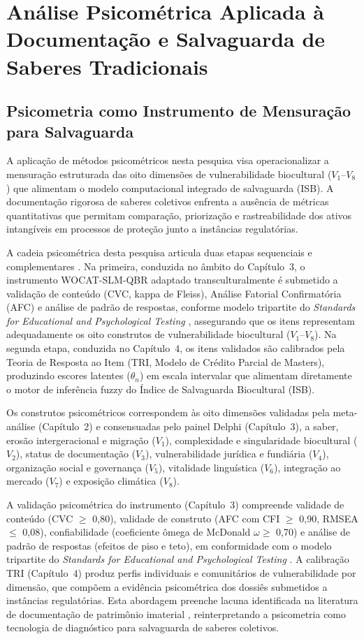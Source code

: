 \section{Análise Psicométrica Aplicada à Documentação e Salvaguarda de Saberes Tradicionais}

\subsection{Psicometria como Instrumento de Mensuração para Salvaguarda}

A aplicação de métodos psicométricos nesta pesquisa visa operacionalizar a mensuração estruturada das oito dimensões de vulnerabilidade biocultural ($V_1$--$V_8$) que alimentam o modelo computacional integrado de salvaguarda (ISB). A documentação rigorosa de saberes coletivos enfrenta a ausência de métricas quantitativas que permitam comparação, priorização e rastreabilidade dos ativos intangíveis em processos de proteção junto a instâncias regulatórias.

A cadeia psicométrica desta pesquisa articula duas etapas sequenciais e complementares \cite{SmithParr2000,ZhouWang2022}. Na primeira, conduzida no âmbito do Capítulo~3, o instrumento WOCAT-SLM-QBR adaptado transculturalmente é submetido a validação de conteúdo (CVC, kappa de Fleiss), Análise Fatorial Confirmatória (AFC) e análise de padrão de respostas, conforme modelo tripartite do \textit{Standards for Educational and Psychological Testing} \cite{Association2018}, assegurando que os itens representam adequadamente os oito construtos de vulnerabilidade biocultural ($V_1$--$V_8$). Na segunda etapa, conduzida no Capítulo~4, os itens validados são calibrados pela Teoria de Resposta ao Item (TRI, Modelo de Crédito Parcial de Masters), produzindo escores latentes ($\theta_n$) em escala intervalar que alimentam diretamente o motor de inferência fuzzy do Índice de Salvaguarda Biocultural (ISB).

Os construtos psicométricos correspondem às oito dimensões validadas pela meta-análise (Capítulo~2) e consensuadas pelo painel Delphi (Capítulo~3), a saber, erosão intergeracional e migração ($V_1$), complexidade e singularidade biocultural ($V_2$), status de documentação ($V_3$), vulnerabilidade jurídica e fundiária ($V_4$), organização social e governança ($V_5$), vitalidade linguística ($V_6$), integração ao mercado ($V_7$) e exposição climática ($V_8$).

A validação psicométrica do instrumento (Capítulo~3) compreende validade de conteúdo (CVC $\geq$ 0,80), validade de construto (AFC com CFI $\geq$ 0,90, RMSEA $\leq$ 0,08), confiabilidade (coeficiente ômega de McDonald $\omega \geq$ 0,70) e análise de padrão de respostas (efeitos de piso e teto), em conformidade com o modelo tripartite do \textit{Standards for Educational and Psychological Testing} \cite{Association2018}. A calibração TRI (Capítulo~4) produz perfis individuais e comunitários de vulnerabilidade por dimensão, que compõem a evidência psicométrica dos dossiês submetidos a instâncias regulatórias. Esta abordagem preenche lacuna identificada na literatura de documentação de patrimônio imaterial \cite{Lev2001,WuLi2022}, reinterpretando a psicometria como tecnologia de diagnóstico para salvaguarda de saberes coletivos.

